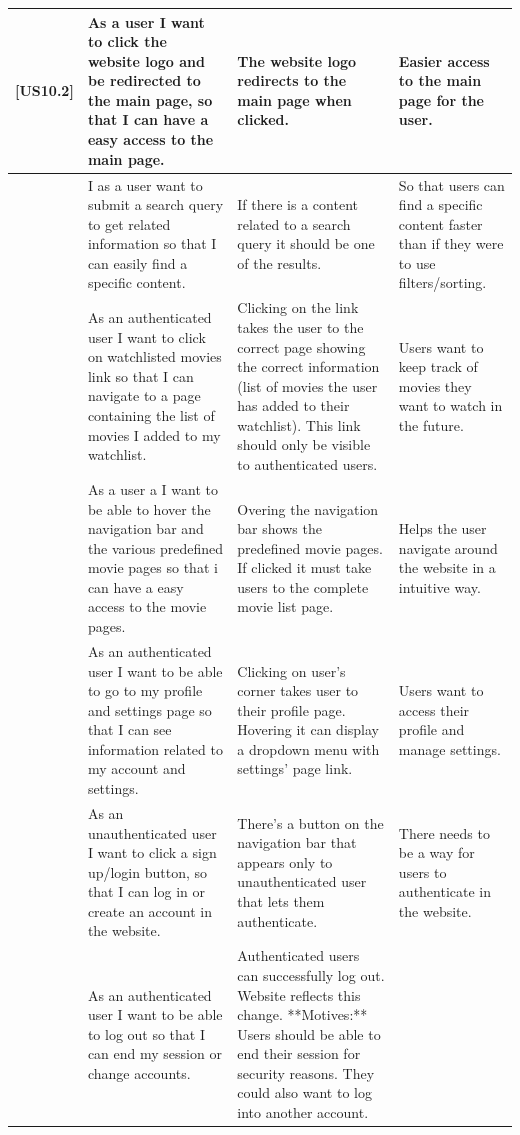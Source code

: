 \documentclass{article}
\begin{document}
\begin{longtable}{|p{1cm}|p{3cm}|p{6cm}|p{6cm}|}
[US10.2] & As a user I want to click the website logo and be redirected to the main page, so that I can have a easy access to the main page. & The website logo redirects to the main page when clicked. & Easier access to the main page for the user. \\ \hline
[US10.6] & I as a user want to submit a search query to get related information so that I can easily find a specific content. & If there is a content related to a search query it should be one of the results. & So that users can find a specific content faster than if they were to use filters/sorting. \\ \hline
[US10.5] & As an authenticated user I want to click on watchlisted movies link so that I can navigate to a page containing the list of movies I added to my watchlist. & Clicking on the link takes the user to the correct page showing the correct information (list of movies the user has added to their watchlist). This link should only be visible to authenticated users. & Users want to keep track of movies they want to watch in the future. \\ \hline
[US10.3] & As a user a I want to be able to hover the navigation bar and the various predefined movie pages so that i can have a easy access to the movie pages. & Overing the navigation bar shows the predefined movie pages. If clicked it must take users to the complete movie list page. & Helps the user navigate around the website in a intuitive way. \\ \hline
[US10.7] & As an authenticated user I want to be able to go to my profile and settings page so that I can see information related to my account and settings. & Clicking on user's corner takes user to their profile page. Hovering it can display a dropdown menu with settings' page link. & Users want to access their profile and manage settings. \\ \hline
[US10.8] & As an unauthenticated user I want to click a sign up/login button, so that I can log in or create an account in the website. & There's a button on the navigation bar that appears only to unauthenticated user that lets them authenticate. & There needs to be a way for users to authenticate in the website. \\ \hline
[US5.4] & As an authenticated user I want to be able to log out so that I can end my session or change accounts. & Authenticated users can successfully log out. Website reflects this change.  **Motives:** Users should be able to end their session for security reasons. They could also want to log into another account. &  \\ \hline

\end{longtable}
\end{document}
